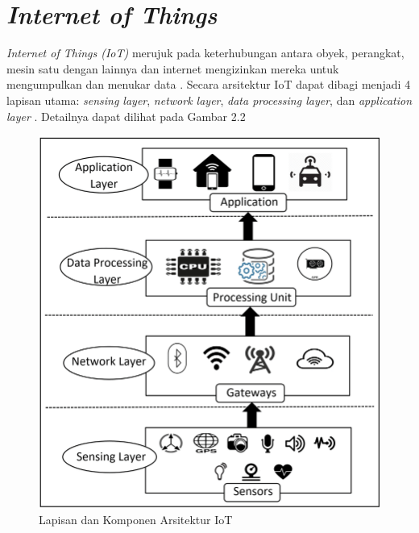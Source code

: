 \section{\textit{Internet of Things}}

\noindent \textit{Internet of Things (IoT)} merujuk pada keterhubungan antara obyek, perangkat, mesin satu dengan lainnya dan internet mengizinkan mereka untuk mengumpulkan dan menukar data \parencite{inproc:gazis}. Secara arsitektur IoT dapat dibagi menjadi 4 lapisan utama: \textit{sensing layer}, \textit{network layer}, \textit{data processing layer}, dan \textit{application layer} \parencite{article:sikder}. Detailnya dapat dilihat pada Gambar 2.2

\begin{figure}[ht]
    \includegraphics[width=0.6\linewidth, center]{images/tinjauan-pustaka/fig-iot-architecture.png}
    \caption{Lapisan dan Komponen Arsitektur IoT \parencite{article:sikder}}
    \label{fig:iot-architecture}
\end{figure}

